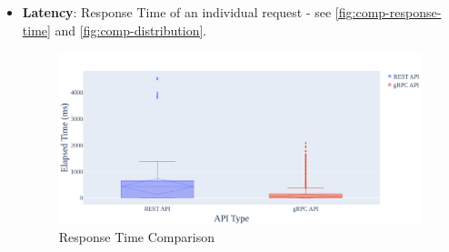 \begin{itemize}
    \item 
        \textbf{Latency}: Response Time of an individual request - see \autoref{fig:comp-response-time} and \autoref{fig:comp-distribution}.
        \begin{figure}[htpb]
            \centering
                \includegraphics[width=\linewidth]{images/plots/comp/response_time_comparison.png}
            \caption[Response Time Comparison]{Response Time Comparison}\label{fig:comp-response-time}
        \end{figure}
        

\end{itemize}
